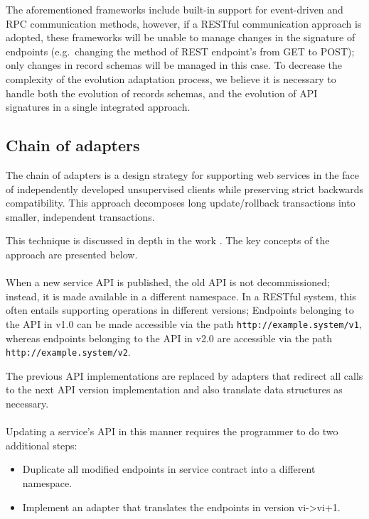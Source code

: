 The aforementioned frameworks include built-in support for event-driven and RPC communication methods,
however, if a RESTful communication approach is adopted, these frameworks will be unable to manage changes in the signature of endpoints
(e.g.\ changing the method of REST endpoint's from GET to POST); only changes in record schemas will be managed in this case.
To decrease the complexity of the evolution adaptation process, we believe it is necessary to handle both the evolution of records schemas, and the evolution of API signatures in a single integrated approach.

\subsection{Chain of adapters} %
\label{sec:chain_of_adapters}

The chain of adapters is a design strategy for supporting web services in the face of independently developed unsupervised clients while preserving strict backwards compatibility.
This approach decomposes long update/rollback transactions into smaller, independent transactions.

This technique is discussed in depth in the work \cite{13}. The key concepts of the approach are presented below.

\paragraph{}

When a new service API is published, the old API is not decommissioned;
instead, it is made available in a different namespace.
In a RESTful system, this often entails supporting operations in different versions;
Endpoints belonging to the API in v1.0 can be made accessible via the path \texttt{http://example.system/v1},
whereas endpoints belonging to the API in v2.0 are accessible via the path \texttt{http://example.system/v2}.

The previous API implementations are replaced by adapters that redirect all calls to the next API version implementation and also translate data structures as necessary.

\paragraph{}

Updating a service's API in this manner requires the programmer to do two additional steps:
\begin{itemize}
    \item Duplicate all modified endpoints in service contract into a different namespace.
    \item Implement an adapter that translates the endpoints in version vi->vi+1.
\end{itemize}

